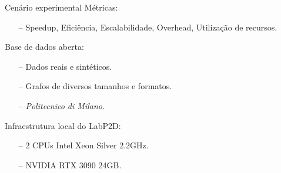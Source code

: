 \begin{frame}{Cenário experimental}
    Métricas:
    \begin{itemize}
        \item[--] Speedup, Eficiência, Escalabilidade, Overhead, Utilização de recursos.
    \end{itemize}

    Base de dados aberta:
    \begin{itemize}
        \item[--] Dados reais e sintéticos.
        \item[--] Grafos de diversos tamanhos e formatos.
        \item[--] \textit{Politecnico di Milano}.
    \end{itemize}

    Infraestrutura local do LabP2D:
    \begin{itemize}
        \item[--] 2 CPUs Intel Xeon Silver 2.2GHz.
        \item[--] NVIDIA RTX 3090 24GB.
    \end{itemize}
\end{frame}
